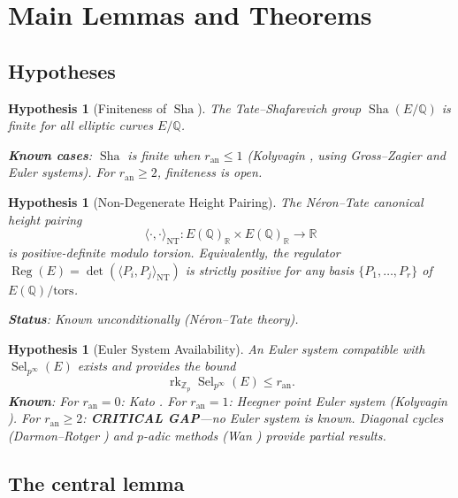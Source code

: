 \documentclass[11pt]{article}
\newtheorem{hypothesis}[theorem]{Hypothesis}
\DeclareMathOperator{\rk}{rk}
\DeclareMathOperator{\Reg}{Reg}
\DeclareMathOperator{\Sha}{Sha}
\DeclareMathOperator{\Sel}{Sel}
\begin{document}
\section{Main Lemmas and Theorems}
\label{sec:main}

\subsection{Hypotheses}

\begin{hypothesis}[Finiteness of $\Sha$]
\label{hyp:sha-finite}
The Tate--Shafarevich group $\Sha(E/\mathbb{Q})$ is finite for all elliptic
curves $E/\mathbb{Q}$.

\textbf{Known cases}: $\Sha$ is finite when $r_{\mathrm{an}} \leq 1$
(Kolyvagin \cite{Koly}, using Gross--Zagier and Euler systems).  For
$r_{\mathrm{an}} \geq 2$, finiteness is open.
\end{hypothesis}

\begin{hypothesis}[Non-Degenerate Height Pairing]
\label{hyp:height}
The N\'eron--Tate canonical height pairing
\[
  \langle \cdot, \cdot \rangle_{\mathrm{NT}} :
  E(\mathbb{Q})_{\mathbb{R}} \times E(\mathbb{Q})_{\mathbb{R}} \to \mathbb{R}
\]
is positive-definite modulo torsion.  Equivalently, the regulator
$\Reg(E) = \det(\langle P_i, P_j \rangle_{\mathrm{NT}})$ is strictly positive
for any basis $\{P_1, \ldots, P_r\}$ of $E(\mathbb{Q})/\mathrm{tors}$.

\textbf{Status}: Known unconditionally (N\'eron--Tate theory).
\end{hypothesis}

\begin{hypothesis}[Euler System Availability]
\label{hyp:euler}
An Euler system compatible with $\Sel_{p^\infty}(E)$ exists and provides the
bound
\[
  \rk_{\mathbb{Z}_p} \Sel_{p^\infty}(E) \leq r_{\mathrm{an}}.
\]
\textbf{Known}: For $r_{\mathrm{an}} = 0$: Kato \cite{Kato}.  For
$r_{\mathrm{an}} = 1$: Heegner point Euler system (Kolyvagin \cite{Koly}).
For $r_{\mathrm{an}} \geq 2$: \textbf{CRITICAL GAP}---no Euler system is
known.  Diagonal cycles (Darmon--Rotger \cite{DR}) and $p$-adic methods
(Wan \cite{Wan}) provide partial results.
\end{hypothesis}

\subsection{The central lemma}
\end{document}
